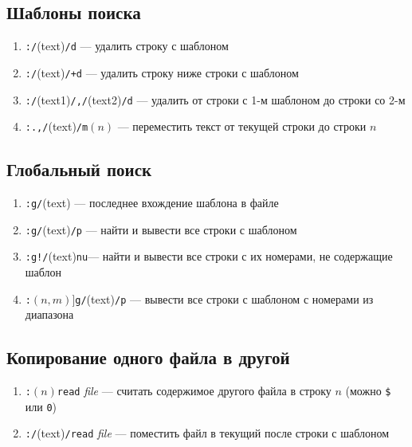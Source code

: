 \documentclass[a4paper,10pt, twocolumn]{article}
\newcommand*{\cod}[1]{\texttt{#1}}
\begin{document}
\subsection{Шаблоны поиска}
\begin{enumerate}
    \item \cod{:/}(text)\cod{/d} --- удалить строку с шаблоном
    \item \cod{:/}(text)\cod{/+d} --- удалить строку ниже строки с шаблоном
    \item \cod{:/}(text1)\cod{/,/}(text2)\cod{/d} --- удалить от строки с 1-м шаблоном до строки со 2-м
    \item \cod{:.,/}(text)\cod{/m}$(n)$ --- переместить текст от текущей строки до строки $n$
\end{enumerate}

\subsection{Глобальный поиск}
\begin{enumerate}
    \item \cod{:g/}(text) --- последнее вхождение шаблона в файле
    \item \cod{:g/}(text)\cod{/p} --- найти и вывести все строки с шаблоном
    \item \cod{:g!/}(text)\cod{nu}--- найти и вывести все строки с их номерами, не содержащие шаблон
    \item \cod{:}$(n,m)$]\cod{g/}(text)\cod{/p} --- вывести все строки с шаблоном с номерами из диапазона
\end{enumerate}

\subsection{Копирование одного файла в другой}
\begin{enumerate}
    \item \cod{:}$(n)$\cod{read} \textit{file} --- считать содержимое другого файла в строку $n$ (можно \cod{\$} или \cod{0})
    \item \cod{:/}(text)\cod{/read} \textit{file} --- поместить файл в текущий после строки с шаблоном 
\end{enumerate}
\end{document}
